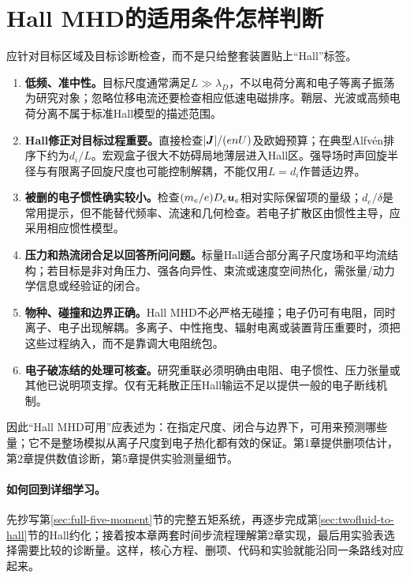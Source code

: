 \section{Hall MHD的适用条件怎样判断}
应针对目标区域及目标诊断检查，而不是只给整套装置贴上“Hall”标签。
\begin{enumerate}
\item \textbf{低频、准中性。}目标尺度通常满足$L\gg\lambda_D$，不以电荷分离和电子等离子振荡为研究对象；忽略位移电流还要检查相应低速电磁排序。鞘层、光波或高频电荷分离不属于标准Hall模型的描述范围。
\item \textbf{Hall修正对目标过程重要。}直接检查$|\bm{J}|/(enU)$及欧姆预算；在典型Alfvén排序下约为$d_i/L$。宏观盒子很大不妨碍局地薄层进入Hall区。强导场时声回旋半径与有限离子回旋尺度也可能控制解耦，不能仅用$L=d_i$作普适边界。
\item \textbf{被删的电子惯性确实较小。}检查$(m_e/e)D_e\bm{u}_e$相对实际保留项的量级；$d_e/\delta$是常用提示，但不能替代频率、流速和几何检查。若电子扩散区由惯性主导，应采用相应惯性模型。
\item \textbf{压力和热流闭合足以回答所问问题。}标量Hall适合部分离子尺度场和平均流结构；若目标是非对角压力、强各向异性、束流或速度空间热化，需张量/动力学信息或经验证的闭合。
\item \textbf{物种、碰撞和边界正确。}Hall MHD不必严格无碰撞；电子仍可有电阻，同时离子、电子出现解耦。多离子、中性拖曳、辐射电离或装置背压重要时，须把这些过程纳入，而不是靠调大电阻统包。
\item \textbf{电子破冻结的处理可核查。}研究重联必须明确由电阻、电子惯性、压力张量或其他已说明项支撑。仅有无耗散正压Hall输运不足以提供一般的电子断线机制。
\end{enumerate}
因此“Hall MHD可用”应表述为：在指定尺度、闭合与边界下，可用来预测哪些量；它不是整场模拟从离子尺度到电子热化都有效的保证。第1章提供删项估计，第2章提供数值诊断，第5章提供实验测量细节。



\paragraph{如何回到详细学习。}
先抄写第\ref{sec:full-five-moment}节的完整五矩系统，再逐步完成第\ref{sec:twofluid-to-hall}节的Hall约化；接着按本章两套时间步流程理解第2章实现，最后用实验表选择需要比较的诊断量。这样，核心方程、删项、代码和实验就能沿同一条路线对应起来。
